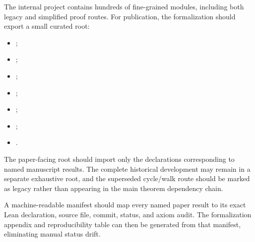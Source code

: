 The internal project contains hundreds of fine-grained modules, including both
legacy and simplified proof routes. For publication, the formalization should
export a small curated root:
\begin{itemize}
\item {};
\item {};
\item {};
\item {};
\item {};
\item {};
\item {}.
\end{itemize}
The paper-facing root should import only the declarations corresponding to
named manuscript results. The complete historical development may remain in a
separate exhaustive root, and the superseded cycle/walk route should be marked
as legacy rather than appearing in the main theorem dependency chain.

A machine-readable manifest should map every named paper result to its exact
Lean declaration, source file, commit, status, and axiom audit. The
formalization appendix and reproducibility table can then be generated from
that manifest, eliminating manual status drift.
